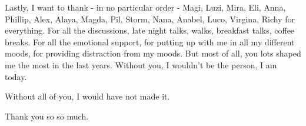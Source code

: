Lastly, I want to thank - in no particular order - Magi, Luzi, Mira, Eli, Anna, Phillip, Alex,
Alaya, Magda, Pil, Storm, Nana, Anabel, Luco, Virgina, Richy for everything. For all the
discussions, late night talks, walks, breakfast talks, coffee breaks. For all the emotional support,
for putting up with me in all my different moods, for providing distraction from my moods. But most
of all, you lots shaped me the most in the last years. Without you, I wouldn't be the person, I am
today.

Without all of you, I would have not made it.

\begin{flushright}
	Thank you so so much.
\end{flushright}
